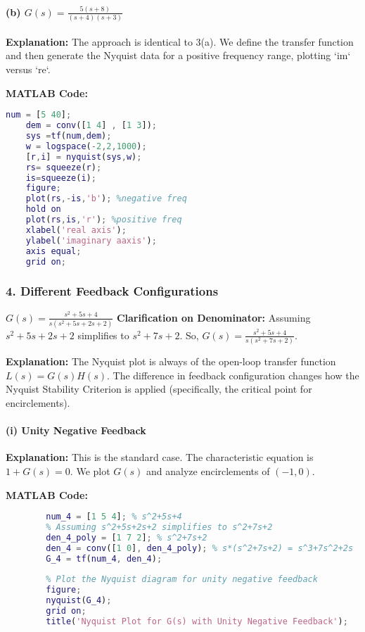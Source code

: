 \documentclass[a4paper,12pt]{article}
\begin{document}
	\paragraph{(b) $G(s)=\frac{5(s+8)}{(s+4)(s+3)}$}
	\textbf{Explanation:}
	The approach is identical to 3(a). We define the transfer function and then generate the Nyquist data for a positive frequency range, plotting `im` versus `re`.
	
	\textbf{MATLAB Code:}
	\begin{lstlisting}[language=Matlab, caption=MATLAB Code for Problem 3(b)]
	num = [5 40];
	dem = conv([1 4] , [1 3]);
	sys =tf(num,dem);
	w = logspace(-2,2,1000);
	[r,i] = nyquist(sys,w);
	rs= squeeze(r);
	is=squeeze(i);
	figure;
	plot(rs,-is,'b'); %negative freq
	hold on 
	plot(rs,is,'r'); %positive freq
	xlabel('real axis');
	ylabel('imaginary aaxis');
	axis equal;
	grid on;
	\end{lstlisting}
	
	\subsubsection*{4. Different Feedback Configurations}
	$G(s) = \frac{s^2+5s+4}{s(s^2+5s+2s+2)}$
	\textbf{Clarification on Denominator:} Assuming $s^2+5s+2s+2$ simplifies to $s^2+7s+2$.
	So, $G(s) = \frac{s^2+5s+4}{s(s^2+7s+2)}$.
	
	\textbf{Explanation:}
	The Nyquist plot is always of the open-loop transfer function $L(s) = G(s)H(s)$. The difference in feedback configuration changes how the Nyquist Stability Criterion is applied (specifically, the critical point for encirclements).
	
	\paragraph{(i) Unity Negative Feedback}
	\textbf{Explanation:}
	This is the standard case. The characteristic equation is $1 + G(s) = 0$. We plot $G(s)$ and analyze encirclements of $(-1, 0)$.
	
	\textbf{MATLAB Code:}
	\begin{lstlisting}[language=Matlab, caption=MATLAB Code for Problem 4(i) (Unity Negative Feedback)]
		% Define the transfer function
		num_4 = [1 5 4]; % s^2+5s+4
		% Assuming s^2+5s+2s+2 simplifies to s^2+7s+2
		den_4_poly = [1 7 2]; % s^2+7s+2
		den_4 = conv([1 0], den_4_poly); % s*(s^2+7s+2) = s^3+7s^2+2s
		G_4 = tf(num_4, den_4);
		
		% Plot the Nyquist diagram for unity negative feedback
		figure;
		nyquist(G_4);
		grid on;
		title('Nyquist Plot for G(s) with Unity Negative Feedback');
	\end{lstlisting}
	
\end{document}
